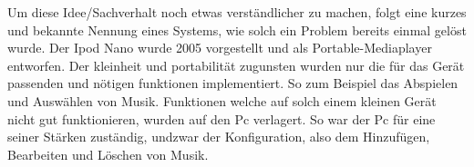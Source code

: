 \myNewSection
Um diese Idee/Sachverhalt noch etwas verständlicher zu machen, folgt eine kurzes und bekannte Nennung eines Systems, wie solch ein Problem bereits einmal gelöst wurde.
Der Ipod Nano\cite{ipodNano} wurde 2005 vorgestellt und als Portable-Mediaplayer entworfen. Der kleinheit und portabilität zugunsten wurden nur die für das Gerät passenden und nötigen funktionen implementiert. So zum Beispiel das Abspielen und Auswählen von Musik. Funktionen welche auf solch einem kleinen Gerät nicht gut funktionieren, wurden auf den Pc verlagert. So war der Pc für eine seiner Stärken zuständig, undzwar der Konfiguration, also dem Hinzufügen, Bearbeiten und Löschen von Musik.
